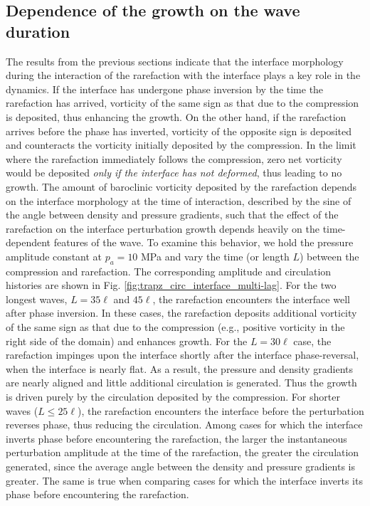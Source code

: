 \documentclass{jfm}%
\begin{document}
\subsection{\label{subsubsec:transient}Dependence of the growth on the wave duration}%
The results from the previous sections indicate that the interface
morphology during the interaction of the rarefaction with the
interface plays a key role in the dynamics.  If the interface has
undergone phase inversion by the time the rarefaction has arrived,
vorticity of the same sign as that due to the compression is
deposited, thus enhancing the growth.  On the other hand, if the
rarefaction arrives before the phase has inverted, vorticity of the
opposite sign is deposited and counteracts the vorticity initially
deposited by the compression. In the limit where the rarefaction
immediately follows the compression, zero net vorticity would be
deposited \emph{only if the interface has not deformed}, thus leading
to no growth.  The amount of baroclinic vorticity deposited by the
rarefaction depends on the interface morphology at the time of
interaction, described by the sine of the angle between density and
pressure gradients, such that the effect of the rarefaction on the
interface perturbation growth depends heavily on the time-dependent
features of the wave. To examine this behavior, we hold the pressure
amplitude constant at $p_a = 10$ MPa and vary the time (or length $L$)
between the compression and rarefaction. The corresponding amplitude
and circulation histories are shown in Fig.
\ref{fig:trapz_circ_interface_multi-lag}.  For the two longest waves,
$L=35\ell$ and $45\ell$, the rarefaction encounters the interface well
after phase inversion. In these cases, the rarefaction deposits
additional vorticity of the same sign as that due to the compression
(e.g., positive vorticity in the right side of the domain) and
enhances growth. For the $L=30\ell$ case, the rarefaction impinges
upon the interface shortly after the interface phase-reversal, when
the interface is nearly flat. As a result, the pressure and density
gradients are nearly aligned and little additional circulation is
generated. Thus the growth is driven purely by the circulation
deposited by the compression. For shorter waves ($L \leq 25\ell$), the
rarefaction encounters the interface before the perturbation reverses
phase, thus reducing the circulation.  Among cases for which the
interface inverts phase before encountering the rarefaction, the
larger the instantaneous perturbation amplitude at the time of the
rarefaction, the greater the circulation generated, since the average
angle between the density and pressure gradients is greater. The same
is true when comparing cases for which the interface inverts its phase
before encountering the rarefaction.
\end{document}
